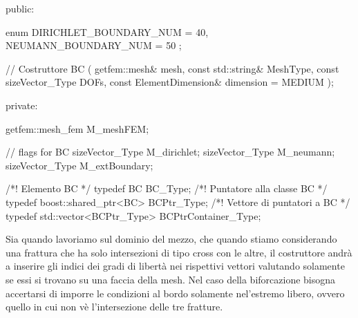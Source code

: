 \newpage	
\begin{Code}[caption={Classe \texttt{BC}}]
public:

    enum
    {
        DIRICHLET_BOUNDARY_NUM = 40,
        NEUMANN_BOUNDARY_NUM = 50
    };

    // Costruttore
    BC ( getfem::mesh& mesh,
         const std::string& MeshType,
         const sizeVector_Type DOFs,
         const ElementDimension& dimension = MEDIUM );

private:

    getfem::mesh_fem M_meshFEM;
    
    // flags for BC
    sizeVector_Type M_dirichlet;
    sizeVector_Type M_neumann;
    sizeVector_Type M_extBoundary;
\end{Code}

\begin{Code}[caption={Typedef per la Classe \texttt{BC}}]
/*! Elemento BC */
typedef BC BC_Type;
/*! Puntatore alla classe BC */												
typedef boost::shared_ptr<BC> BCPtr_Type;
/*! Vettore di puntatori a BC */			
typedef std::vector<BCPtr_Type> BCPtrContainer_Type;	
\end{Code}

Sia quando lavoriamo sul dominio del mezzo, che quando stiamo considerando una frattura che ha solo intersezioni di tipo cross con le altre, il costruttore andrà a inserire gli indici dei gradi di libert\`{a} nei rispettivi vettori valutando solamente se essi si trovano su una faccia della mesh.
Nel caso della biforcazione bisogna accertarsi di imporre le condizioni al bordo solamente nel'estremo libero, ovvero quello in cui non v\`{e} l'intersezione delle tre fratture.

